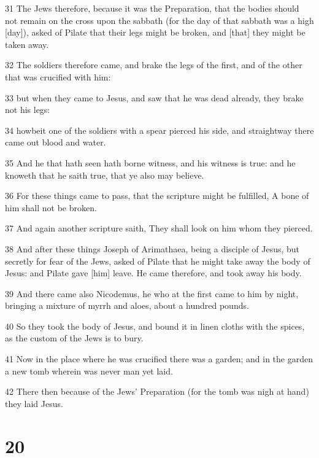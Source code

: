 \par 31 The Jews therefore, because it was the Preparation, that the bodies should not remain on the cross upon the sabbath (for the day of that sabbath was a high [day]), asked of Pilate that their legs might be broken, and [that] they might be taken away.
\par 32 The soldiers therefore came, and brake the legs of the first, and of the other that was crucified with him:
\par 33 but when they came to Jesus, and saw that he was dead already, they brake not his legs:
\par 34 howbeit one of the soldiers with a spear pierced his side, and straightway there came out blood and water.
\par 35 And he that hath seen hath borne witness, and his witness is true: and he knoweth that he saith true, that ye also may believe.
\par 36 For these things came to pass, that the scripture might be fulfilled, A bone of him shall not be broken.
\par 37 And again another scripture saith, They shall look on him whom they pierced.
\par 38 And after these things Joseph of Arimathaea, being a disciple of Jesus, but secretly for fear of the Jews, asked of Pilate that he might take away the body of Jesus: and Pilate gave [him] leave. He came therefore, and took away his body.
\par 39 And there came also Nicodemus, he who at the first came to him by night, bringing a mixture of myrrh and aloes, about a hundred pounds.
\par 40 So they took the body of Jesus, and bound it in linen cloths with the spices, as the custom of the Jews is to bury.
\par 41 Now in the place where he was crucified there was a garden; and in the garden a new tomb wherein was never man yet laid.
\par 42 There then because of the Jews' Preparation (for the tomb was nigh at hand) they laid Jesus.

\chapter{20}

